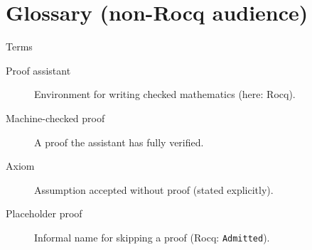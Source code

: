 \documentclass[10pt,aspectratio=169]{beamer}
\begin{document}
\section{Glossary (non-Rocq audience)}

\begin{frame}{Terms}
  \begin{description}
    \item[Proof assistant] Environment for writing checked mathematics (here: Rocq).
    \item[Machine-checked proof] A proof the assistant has fully verified.
    \item[Axiom] Assumption accepted without proof (stated explicitly).
    \item[Placeholder proof] Informal name for skipping a proof (Rocq: \texttt{Admitted}).
  \end{description}
\end{frame}

\end{document}
